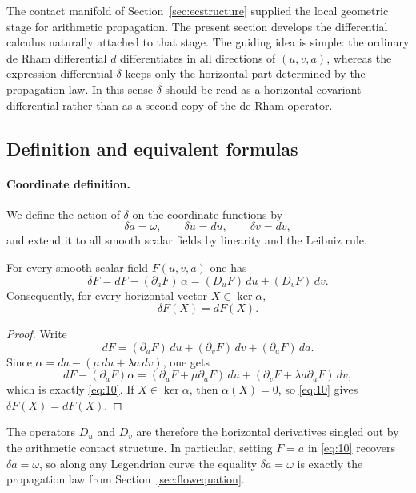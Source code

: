The contact manifold of Section~\ref{sec:ecstructure} supplied the local geometric stage for arithmetic propagation. The present section develops the differential calculus naturally attached to that stage. The guiding idea is simple: the ordinary de Rham differential $d$ differentiates in all directions of $(u,v,a)$, whereas the expression differential $\delta$ keeps only the horizontal part determined by the propagation law. In this sense $\delta$ should be read as a horizontal covariant differential rather than as a second copy of the de Rham operator.

\subsection{Definition and equivalent formulas}

\paragraph{Coordinate definition.}
We define the action of $\delta$ on the coordinate functions by
\begin{equation}\label{eq:9}\tag{9}
\delta a=\omega,
\qquad
\delta u=du,
\qquad
\delta v=dv,
\end{equation}
and extend it to all smooth scalar fields by linearity and the Leibniz rule.

\begin{proposition}\label{prop:delta_equivalent_formula}
For every smooth scalar field $F(u,v,a)$ one has
\begin{equation}\label{eq:10}\tag{10}
\delta F
= dF-(\partial_aF)\,\alpha
= (D_uF)\,du+(D_vF)\,dv.
\end{equation}
Consequently, for every horizontal vector $X\in\ker\alpha$,
\[
\delta F(X)=dF(X).
\]
\end{proposition}

\begin{proof}
Write
\[
dF=(\partial_uF)\,du+(\partial_vF)\,dv+(\partial_aF)\,da.
\]
Since $\alpha=da-(\mu\,du+\lambda a\,dv)$, one gets
\[
dF-(\partial_aF)\alpha
=(\partial_uF+\mu\partial_aF)\,du+(\partial_vF+\lambda a\partial_aF)\,dv,
\]
which is exactly \eqref{eq:10}. If $X\in\ker\alpha$, then $\alpha(X)=0$, so \eqref{eq:10} gives $\delta F(X)=dF(X)$.
\end{proof}

The operators $D_u$ and $D_v$ are therefore the horizontal derivatives singled out by the arithmetic contact structure. In particular, setting $F=a$ in \eqref{eq:10} recovers $\delta a=\omega$, so along any Legendrian curve the equality $\delta a=\omega$ is exactly the propagation law from Section~\ref{sec:flowequation}.

